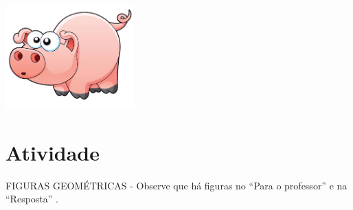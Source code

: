 \documentclass[a4,12pt]{book}
\begin{document}
\includegraphics[width=\textwidth,height=4cm, keepaspectratio]{pig}
\section{Atividade}






\begin{imagem*}[breakable]{}{}   FIGURAS GEOMÉTRICAS - Observe que há figuras no   ``Para o professor''   e na   ``Resposta''  .
\end{imagem*}
\end{document}
